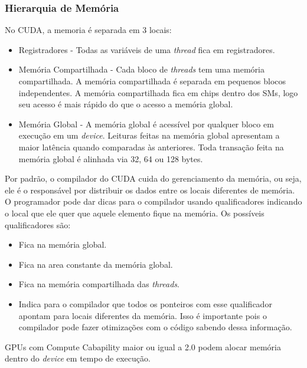 \subsubsection{Hierarquia de Memória}
No CUDA, a memoria é separada em 3 locais:

\begin{itemize}
  \item Registradores - Todas as variáveis de uma \textit{thread} fica em registradores.
  \item Memória Compartilhada - Cada bloco de \textit{threads} tem uma memória compartilhada. A memória compartilhada é separada em
          pequenos blocos independentes. A memória compartilhada fica em chips dentro dos SMs, logo seu acesso é mais rápido do que o acesso a
          memória global.
  \item Memória Global - A memória global é acessível por qualquer bloco em execução em um \textit{device}.
        Leituras feitas na memória global apresentam a maior latência quando comparadas às anteriores.
        Toda transação feita na memória global é alinhada via 32, 64 ou 128 bytes.

\end{itemize}

Por padrão, o compilador do CUDA cuida do gerenciamento da memória, ou seja, ele é o responsável por distribuir os dados
entre os locais diferentes de memória. O programador pode dar dicas para o compilador usando qualificadores indicando o local
que ele quer que aquele elemento fique na memória. Os possíveis qualificadores são:
\begin{itemize}
  \item {} Fica na memória global.
  \item {} Fica na area constante da memória global.
  \item {} Fica na memória compartilhada das \textit{threads}.
  \item {} Indica para o compilador que todos os ponteiros com esse qualificador apontam para locais diferentes
                            da memória. Isso é importante pois o compilador pode fazer otimizações com o código sabendo dessa informação.
\end{itemize}

GPUs com Compute Cabapility maior ou igual a 2.0 podem alocar memória dentro do \textit{device} em tempo de execução.
